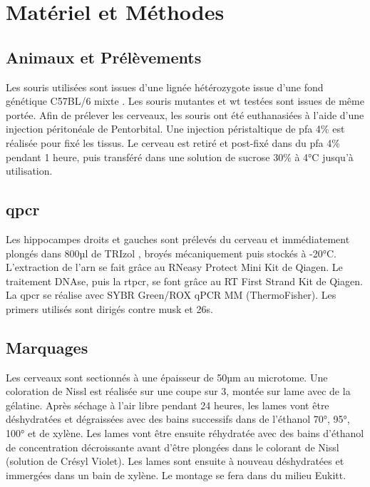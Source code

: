 \chapter{Matériel et Méthodes}

\section{Animaux et Prélèvements}
\label{sec:AnimEtPrelev}
	Les souris utilisées sont issues d'une lignée hétérozygote issue d'une fond génétique C57BL/6 mixte \cite{Messeant2015, Messeant2017}. Les souris mutantes \mcrd et \gls{wt} testées sont issues de même portée. 
	Afin de prélever les cerveaux, les souris ont été euthanasiées à l'aide d'une injection péritonéale de Pentorbital. Une injection péristaltique de \gls{pfa} 4\% est réalisée pour fixé les tissus. Le cerveau est retiré et post-fixé dans du \gls{pfa} 4\% pendant 1 heure, puis transféré dans une solution de sucrose 30\% à 4°C jusqu'à utilisation.
	
\section{\acrshort{qpcr}}
\label{sec:qPCR}
	Les hippocampes droits et gauches sont prélevés du cerveau et immédiatement plongés dans 800µl de TRIzol , broyés mécaniquement  puis stockés à -20°C. L'extraction de l'\gls{arn} se fait grâce au RNeasy Protect Mini Kit de Qiagen\textregistered. Le traitement DNAse, puis la \gls{rtpcr}, se font grâce au RT First Strand Kit de Qiagen\textregistered. La \gls{qpcr} se réalise avec SYBR Green/ROX qPCR MM (ThermoFisher\textregistered). Les primers utilisés sont dirigés contre \gls{musk} et \acrshort{26s}.
	
\section{Marquages}
\label{sec:Marquages}
	Les cerveaux sont sectionnés à une épaisseur de 50µm au microtome. Une coloration de Nissl est réalisée sur une coupe sur 3, montée sur lame avec de la gélatine. Après séchage à l'air libre pendant 24 heures, les lames vont être déshydratées et dégraissées avec des bains successifs dans de l'éthanol 70°, 95°, 100° et de xylène. Les lames vont être ensuite réhydratée avec des bains d'éthanol de concentration décroissante avant d'être plongées dans le colorant de Nissl (solution de Crésyl Violet).  Les lames sont ensuite  à nouveau déshydratées et immergées dans un bain de xylène. Le montage se fera dans du milieu Eukitt\textregistered.
	
